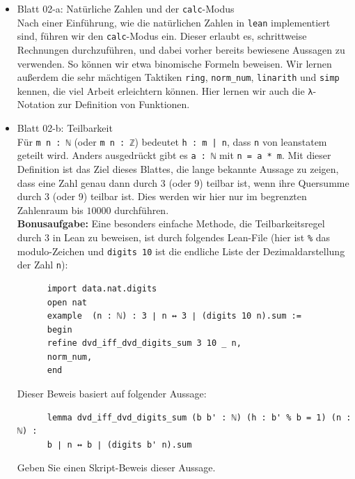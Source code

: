 \documentclass[11pt]{article}
\newcommand{\leanin}{\texttt}
\newcommand{\leanstate}{\texttt}
\begin{document}
\begin{itemize}
\item Blatt 02-a: Natürliche Zahlen und der \leanstate{calc}-Modus\\ %
  Nach einer Einführung, wie die natürlichen Zahlen in \leanstate{lean} implementiert sind, führen wir den \leanstate{calc}-Modus ein. Dieser erlaubt es, schrittweise Rechnungen durchzuführen, und dabei vorher bereits bewiesene Aussagen zu verwenden. So können wir etwa binomische Formeln beweisen. Wir lernen außerdem die sehr mächtigen Taktiken \leanin{ring}, \leanin{norm_num}, \leanin{linarith} und \leanin{simp} kennen, die viel Arbeit erleichtern können. Hier lernen wir auch die \leanstate{λ}-Notation zur Definition von Funktionen.
\item Blatt 02-b: Teilbarkeit\\ %
  Für \leanstate{m n : ℕ} (oder \leanstate{m n : ℤ}) bedeutet \leanstate{h : m | n}, dass \leanstate{n} von leanstate{m} geteilt wird. Anders ausgedrückt gibt es \leanstate{a : ℕ} mit \leanstate{n = a * m}. Mit dieser Definition ist das Ziel dieses Blattes, die lange bekannte Aussage zu zeigen, dass eine Zahl genau dann durch 3 (oder 9) teilbar ist, wenn ihre Quersumme durch 3 (oder 9) teilbar ist. Dies werden wir hier nur im begrenzten Zahlenraum bis $10000$ durchführen.
  \\[2ex]
    {\bf Bonusaufgabe:} Eine besonders einfache Methode, die Teilbarkeitsregel durch 3 in Lean zu beweisen, ist durch folgendes Lean-File (hier ist \leanstate{\%} das modulo-Zeichen und \leanstate{digits 10} ist die endliche Liste der Dezimaldarstellung der Zahl \leanstate{n}):
    \begin{verbatim}
      import data.nat.digits
      open nat 
      example  (n : ℕ) : 3 ∣ n ↔ 3 ∣ (digits 10 n).sum := 
      begin
      refine dvd_iff_dvd_digits_sum 3 10 _ n, 
      norm_num,
      end
    \end{verbatim}
    Dieser Beweis basiert auf folgender Aussage:
    \begin{verbatim}
      lemma dvd_iff_dvd_digits_sum (b b' : ℕ) (h : b' % b = 1) (n : ℕ) :
      b ∣ n ↔ b ∣ (digits b' n).sum 
    \end{verbatim}
    Geben Sie einen Skript-Beweis dieser Aussage.

    

\end{itemize}
\end{document}
